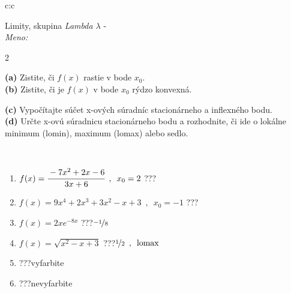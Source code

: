 \documentclass[10pt]{report}
\begin{document}
\begin{tabular}{c:c}
\begin{minipage}[c][104.5mm][t]{0.5\linewidth}
\begin{center}
\vspace{7mm}
{\huge Limity, skupina \textit{Lambda $\lambda$} -}\\[5mm]
\textit{Meno:}\phantom{xxxxxxxxxxxxxxxxxxxxxxxxxxxxxxxxxxxxxxxxxxxxxxxxxxxxxxxxxxxxxxxxx}\\[5mm]
\begin{minipage}{0.95\linewidth}
\begin{center}
{\small \begin{multicols}{2} \raggedright
\textbf{(a)} Zistite, či \(f(x)\) rastie v bode \(x_0\). \\[1mm]
\textbf{(b)} Zistite, či je \(f(x)\) v bode \(x_0\) rýdzo konvexná. \par \columnbreak
\textbf{(c)} Vypočítajte súčet x-ových súradníc stacionárneho a inflexného bodu. \\[1mm]
\textbf{(d)} Určte x-ovú súradnicu stacionárneho bodu a rozhodnite, či ide o lokálne minimum (lomin), maximum (lomax) alebo sedlo. \\[1mm]
\end{multicols}
}
\end{center}
\end{minipage}
\\[4mm]
\begin{minipage}{0.79\linewidth}
\begin{center}
\begin{varwidth}{\linewidth}
\begin{enumerate}
\normalsize
\item $f(x)=\cfrac{-7x^2+2x-6}{3x+6}\enspace , \enspace x_0=2$\quad \dotfill\; ???\;\dotfill \quad {}
\item $f(x)=9x^4+2x^3+3x^2-x+3\enspace , \enspace x_0=-1$\quad \dotfill\; ???\;\dotfill \quad {}
\item $f(x)=2xe^{-8x}$\quad \dotfill\; ???\;\dotfill \quad $\nicefrac{-1}{8}$
\item $f(x)=\sqrt{x^2-x+3}$\quad \dotfill\; ???\;\dotfill \quad $\nicefrac{1}{2}\enspace , \enspace\text{lomax}$
\item \quad \dotfill\; ???\;\dotfill \quad vyfarbite
\item \quad \dotfill\; ???\;\dotfill \quad nevyfarbite
\end{enumerate}
\end{varwidth}

\end{center}
\end{minipage}
\end{center}
\end{minipage}
\end{tabular}
\end{document}
